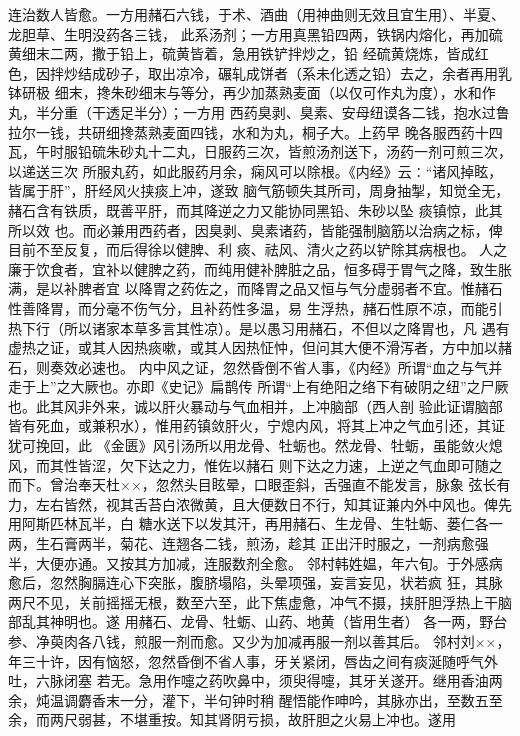 \documentclass[a4paper,12pt,UTF8,twoside]{ctexbook}
\begin{document}
连治数人皆愈。一方用赭石六钱，于术、酒曲（用神曲则无效且宜生用）、半夏、龙胆草、生明没药各三钱， 
此系汤剂；一方用真黑铅四两，铁锅内熔化，再加硫黄细末二两，撒于铅上，硫黄皆着，急用铁铲拌炒之，铅 
经硫黄烧炼，皆成红色，因拌炒结成砂子，取出凉冷，碾轧成饼者（系未化透之铅）去之，余者再用乳钵研极 
细末，搀朱砂细末与等分，再少加蒸熟麦面（以仅可作丸为度），水和作丸，半分重（干透足半分）；一方用 
西药臭剥、臭素、安母纽谟各二钱，抱水过鲁拉尔一钱，共研细搀蒸熟麦面四钱，水和为丸，桐子大。上药早 
晚各服西药十四瓦，午时服铅硫朱砂丸十二丸，日服药三次，皆煎汤剂送下，汤药一剂可煎三次，以递送三次 
所服丸药，如此服药月余，痫风可以除根。《内经》云∶“诸风掉眩，皆属于肝”，肝经风火挟痰上冲，遂致 
脑气筋顿失其所司，周身抽掣，知觉全无，赭石含有铁质，既善平肝，而其降逆之力又能协同黑铅、朱砂以坠 
痰镇惊，此其所以效 
也。而必兼用西药者，因臭剥、臭素诸药，皆能强制脑筋以治病之标，俾目前不至反复，而后得徐以健脾、利 
痰、祛风、清火之药以铲除其病根也。 
人之廉于饮食者，宜补以健脾之药，而纯用健补脾脏之品，恒多碍于胃气之降，致生胀满，是以补脾者宜 
以降胃之药佐之，而降胃之品又恒与气分虚弱者不宜。惟赭石性善降胃，而分毫不伤气分，且补药性多温，易 
生浮热，赭石性原不凉，而能引热下行（所以诸家本草多言其性凉）。是以愚习用赭石，不但以之降胃也，凡 
遇有虚热之证，或其人因热痰嗽，或其人因热怔忡，但问其大便不滑泻者，方中加以赭石，则奏效必速也。 
内中风之证，忽然昏倒不省人事，《内经》所谓“血之与气并走于上”之大厥也。亦即《史记》扁鹊传 
所谓“上有绝阳之络下有破阴之纽”之尸厥也。此其风非外来，诚以肝火暴动与气血相并，上冲脑部（西人剖 
验此证谓脑部皆有死血，或兼积水），惟用药镇敛肝火，宁熄内风，将其上冲之气血引还，其证犹可挽回，此 
《金匮》风引汤所以用龙骨、牡蛎也。然龙骨、牡蛎，虽能敛火熄风，而其性皆涩，欠下达之力，惟佐以赭石 
则下达之力速，上逆之气血即可随之而下。曾治奉天杜××，忽然头目眩晕，口眼歪斜，舌强直不能发言，脉象 
弦长有力，左右皆然，视其舌苔白浓微黄，且大便数日不行，知其证兼内外中风也。俾先用阿斯匹林瓦半，白 
糖水送下以发其汗，再用赭石、生龙骨、生牡蛎、蒌仁各一两，生石膏两半，菊花、连翘各二钱，煎汤，趁其 
正出汗时服之，一剂病愈强半，大便亦通。又按其方加减，连服数剂全愈。 
邻村韩姓媪，年六旬。于外感病愈后，忽然胸膈连心下突胀，腹脐塌陷，头晕项强，妄言妄见，状若疯 
狂，其脉两尺不见，关前摇摇无根，数至六至，此下焦虚惫，冲气不摄，挟肝胆浮热上干脑部乱其神明也。遂 
用赭石、龙骨、牡蛎、山药、地黄（皆用生者） 
各一两，野台参、净萸肉各八钱，煎服一剂而愈。又少为加减再服一剂以善其后。 
邻村刘××，年三十许，因有恼怒，忽然昏倒不省人事，牙关紧闭，唇齿之间有痰涎随呼气外吐，六脉闭塞 
若无。急用作嚏之药吹鼻中，须臾得嚏，其牙关遂开。继用香油两余，炖温调麝香末一分，灌下，半句钟时稍 
醒悟能作呻吟，其脉亦出，至数五至余，而两尺弱甚，不堪重按。知其肾阴亏损，故肝胆之火易上冲也。遂用 
\end{document}
